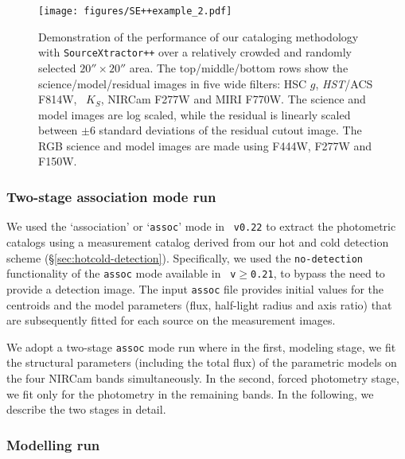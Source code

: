 \documentclass[longauth]{aa}
\begin{document}
\begin{figure}[t!]
\setlength{\abovecaptionskip}{-1mm}
\texttt{[image: figures/SE++example\_2.pdf]}
\caption{Demonstration of the performance of our cataloging methodology with \texttt{SourceXtractor++} over a relatively crowded and randomly selected $\ang{;;20} \times \ang{;;20}$ area. The top/middle/bottom rows show the science/model/residual images in five wide filters: HSC $g$, \textit{HST}/ACS F814W, \UVISTA\ $K_S$, NIRCam F277W and MIRI F770W. The science and model images are log scaled, while the residual is linearly scaled between $\pm 6$ standard deviations of the residual cutout image. The RGB science and model images are made using F444W, F277W and F150W.}
\label{fig:SE++demo}
\end{figure}


\subsubsection{Two-stage association mode run}
We used the `association' or `\texttt{assoc}' mode in \SEpp\ \texttt{v0.22} to extract the photometric catalogs using a measurement catalog derived from our hot and cold detection scheme (\S \ref{sec:hotcold-detection}). Specifically, we used the \texttt{no-detection} functionality of the \texttt{assoc} mode available in \SEpp\ \texttt{v$\geq$0.21}, to bypass the need to provide a detection image. The input \texttt{assoc} file provides initial values for the centroids and the model parameters (flux, half-light radius and axis ratio) that are subsequently fitted for each source on the measurement images.

We adopt a two-stage \texttt{assoc} mode run where in the first, modeling stage, we fit the structural parameters (including the total flux) of the parametric models on the four NIRCam bands simultaneously. In the second, forced photometry stage, we fit only for the photometry in the remaining bands. In the following, we describe the two stages in detail.

\subsubsection{Modelling run} \label{sec:modeling-run}
\end{document}
